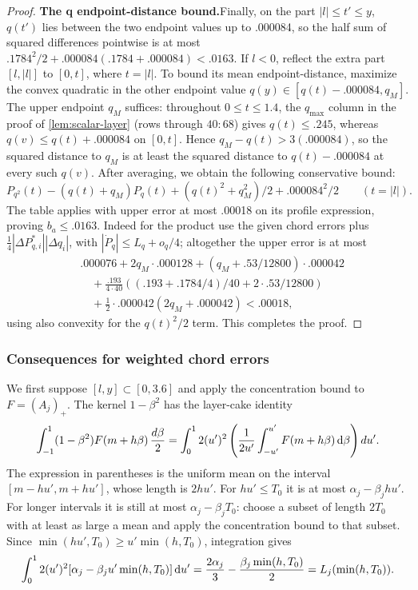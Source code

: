 \begin{proof}
\smallskip \noindent\textbf{The q endpoint-distance bound.}\quad Finally, on the part $|l|\le t'\le y$, $q(t')$ lies between the two endpoint values up to .000084, so the half sum of squared differences pointwise is at most $.1784^2/2+.000084( .1784+.000084)<.0163$. If $l<0$, reflect the extra part $[l,|l|]$ to $[0,t]$, where $t=|l|$. To bound its mean endpoint-distance, maximize the convex quadratic in the other endpoint value $q(y)\in[q(t)-.000084,q_M]$. The upper endpoint $q_M$ suffices: throughout $0\le t\le1.4$, the $q_{\max}$ column in the proof of \cref{lem:scalar-layer} (rows through $40{:}68$) gives $q(t)\le.245$, whereas $q(v)\le q(t)+.000084$ on $[0,t]$. Hence $q_M-q(t)>3(.000084)$, so the squared distance to $q_M$ is at least the squared distance to $q(t)-.000084$ at every such $q(v)$. After averaging, we obtain the following conservative bound:
\[
 P_{q^2}(t)-(q(t)+q_M)P_q(t)+(q(t)^2+q_M^2)/2+.000084^2/2
 \qquad (t=|l|).
\]
The table applies with upper error at most .00018 on its profile expression, proving $b_a\le.0163$. Indeed for the product use the given chord errors plus $\tfrac14|\Delta P_{q,i}^*||\Delta q_i|$, with $|\dot P_q|\le L_q+o_q/4$; altogether the upper error is at most
\[
\begin{aligned}
 &.000076+2q_M\cdot.000128+(q_M+.53/12800)\cdot.000042\\
 &\quad+\frac{.193}{4\cdot40}
       \left((.193+.1784/4)/40+2\cdot.53/12800\right)\\
 &\quad+\tfrac12\cdot.000042(2q_M+.000042)<.00018,
\end{aligned}
\]
using also convexity for the $q(t)^2/2$ term. This completes the proof.
\end{proof}

\subsubsection{Consequences for weighted chord errors}

We first suppose $[l,y]\subset[0,3.6]$ and apply the concentration bound to $F=(A_j)_+$. The kernel $1-\beta^2$ has the layer-cake identity
\[
 \int_{-1}^1(1-\beta^2)F(m+h\beta)\,\frac{d\beta}{2}
 =\int_0^1 2(u')^2
   \left(\frac1{2u'}\int_{-u'}^{u'}F(m+h\beta)\,\mathrm{d} \beta\right)du'.
\]
The expression in parentheses is the uniform mean on the interval $[m-hu',m+hu']$, whose length is $2hu'$. For $hu'\le T_0$ it is at most $\alpha_j-\beta_jhu'$. For longer intervals it is still at most $\alpha_j-\beta_jT_0$: choose a subset of length $2T_0$ with at least as large a mean and apply the concentration bound to that subset. Since $\min(hu',T_0)\ge u'\min(h,T_0)$, integration gives
\[
 \int_0^1 2(u')^2
       [\alpha_j-\beta_j u'\min(h,T_0)]\,\mathrm{d} u'
 =\frac{2\alpha_j}{3}-\frac{\beta_j\min(h,T_0)}2
 =L_j(\min(h,T_0)).
\]

